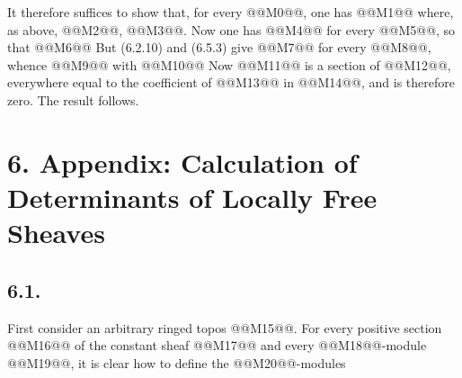 
It therefore suffices to show that, for every @@M0@@, one has
@@M1@@
where, as above, @@M2@@, @@M3@@. Now one has
@@M4@@
for every @@M5@@, so that
@@M6@@
But (6.2.10) and (6.5.3) give
@@M7@@
for every @@M8@@, whence
@@M9@@
with
@@M10@@
Now @@M11@@ is a section of @@M12@@, everywhere equal to the coefficient of @@M13@@ in @@M14@@, and is therefore zero. The result follows.

\section*{6. Appendix: Calculation of Determinants of Locally Free Sheaves}

\subsection*{6.1.}
First consider an arbitrary ringed topos @@M15@@. For every positive section @@M16@@ of the constant sheaf @@M17@@ and every @@M18@@-module @@M19@@, it is clear how to define the @@M20@@-modules
